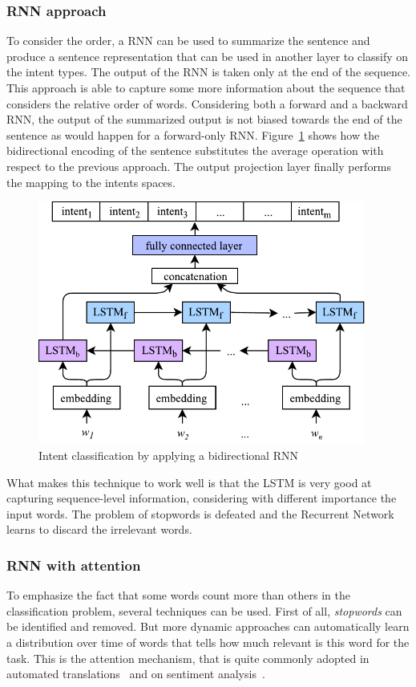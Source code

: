 \subsubsection{RNN approach}
To consider the order, a RNN can be used to summarize the sentence and produce a sentence representation that can be used in another layer to classify on the intent types. The output of the RNN is taken only at the end of the sequence. This approach is able to capture some more information about the sequence that considers the relative order of words. Considering both a forward and a backward RNN, the output of the summarized output is not biased towards the end of the sentence as would happen for a forward-only RNN. Figure~\ref{fig:intentBidirectionalRNN} shows how the bidirectional encoding of the sentence substitutes the average operation with respect to the previous approach. The output projection layer finally performs the mapping to the intents spaces.

\begin{figure}[!htbp]
    \centering
    \includegraphics[max width=\linewidth,max height=8cm,keepaspectratio]{figures/intentBidirectionalRNN}
    \caption{Intent classification by applying a bidirectional RNN}\label{fig:intentBidirectionalRNN}
\end{figure}

What makes this technique to work well is that the LSTM is very good at capturing sequence-level information, considering with different importance the input words. The problem of stopwords is defeated and the Recurrent Network learns to discard the irrelevant words.

\subsubsection{RNN with attention}
To emphasize the fact that some words count more than others in the classification problem, several techniques can be used. First of all, \textit{stopwords} can be identified and removed. But more dynamic approaches can automatically learn a distribution over time of words that tells how much relevant is this word for the task. This is the attention mechanism, that is quite commonly adopted in automated translations~\cite{bahdanau2014neural} and on sentiment analysis~\cite{lin2017structured}.

